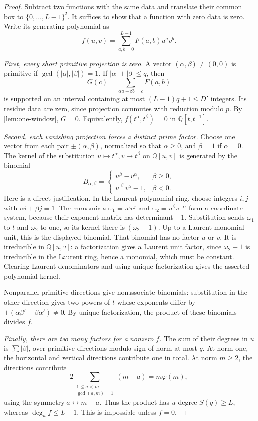 \documentclass[11pt,letterpaper]{article}
\theoremstyle{definition}
\theoremstyle{remark}
\newcommand{\Q}{\mathbb Q}
\newcommand{\abs}[1]{\left|#1\right|}
\begin{document}
\begin{proof}
Subtract two functions with the same data and translate their common
box to \(\{0,\ldots,L-1\}^2\). It suffices to show that a function
with zero data is zero. Write its generating polynomial as
\[
 f(u,v)=\sum_{a,b=0}^{L-1}F(a,b)u^av^b.
\]

\emph{First, every short primitive projection is zero.}
A vector \((\alpha,\beta)\ne(0,0)\) is primitive if
\(\gcd(\abs\alpha,\abs\beta)=1\). If
\(\abs\alpha+\abs\beta\le q\), then
\[
 G(c)=\sum_{\alpha a+\beta b=c}F(a,b)
\]
is supported on an interval containing at most
\((L-1)q+1\le D'\) integers. Its residue data are zero, since
projection commutes with reduction modulo \(p\). By
\cref{lem:one-window}, \(G=0\). Equivalently,
\(f(t^\alpha,t^\beta)=0\) in \(\Q[t,t^{-1}]\).

\emph{Second, each vanishing projection forces a distinct prime factor.}
Choose one vector from each pair \(\pm(\alpha,\beta)\), normalized so
that \(\alpha\ge0\), and \(\beta=1\) if \(\alpha=0\).
The kernel of the substitution \(u\mapsto t^\alpha,v\mapsto t^\beta\)
on \(\Q[u,v]\) is generated by the binomial
\[
 B_{\alpha,\beta}=
 \begin{cases}
 u^\beta-v^\alpha,&\beta\ge0,\\
 u^{\abs\beta}v^\alpha-1,&\beta<0.
 \end{cases}
\]
Here is a direct justification. In the Laurent polynomial ring,
choose integers \(i,j\) with \(\alpha i+\beta j=1\).
The monomials \(\omega_1=u^iv^j\) and \(\omega_2=u^\beta v^{-\alpha}\)
form a coordinate system, because their exponent matrix has
determinant \(-1\). Substitution sends \(\omega_1\) to \(t\) and
\(\omega_2\) to one, so its kernel there is \((\omega_2-1)\). Up to a Laurent monomial unit, this is
the displayed binomial. That binomial has no factor \(u\) or \(v\).
It is irreducible in \(\Q[u,v]\): a factorization gives a Laurent
unit factor, since \(\omega_2-1\) is irreducible in the Laurent ring,
hence a monomial, which must be constant.
Clearing Laurent denominators and using unique factorization gives
the asserted polynomial kernel.

Nonparallel primitive directions give nonassociate binomials:
substitution in the other direction gives two powers of \(t\)
whose exponents differ by \(\pm(\alpha\beta'-\beta\alpha')\ne0\).
By unique factorization, the product of these binomials divides \(f\).

\emph{Finally, there are too many factors for a nonzero \(f\).}
The sum of their degrees in \(u\) is
\(\sum\abs\beta\), over primitive directions modulo sign of norm
at most \(q\). At norm one, the horizontal and vertical directions
contribute one in total. At norm \(m\ge2\), the directions contribute
\[
 2\sum_{\substack{1\le a<m\\\gcd(a,m)=1}}(m-a)
 =m\varphi(m),
\]
using the symmetry \(a\leftrightarrow m-a\). Thus the product has
\(u\)-degree \(S(q)\ge L\), whereas \(\deg_uf\le L-1\).
This is impossible unless \(f=0\).
\end{proof}
\end{document}
